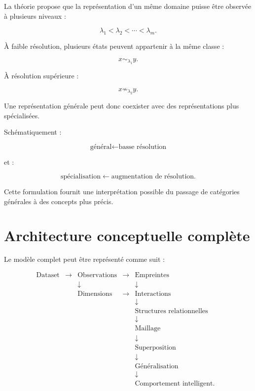 \documentclass[11pt,a4paper]{article}
\begin{document}
La théorie propose que la représentation d'un même domaine puisse être
observée à plusieurs niveaux :

\[
\lambda_1<\lambda_2<\cdots<\lambda_m.
\]

À faible résolution, plusieurs états peuvent appartenir à la même classe :

\[
x\sim_{\lambda_1}y.
\]

À résolution supérieure :

\[
x\not\sim_{\lambda_2}y.
\]

Une représentation générale peut donc coexister avec des représentations
plus spécialisées.

Schématiquement :

\[
\boxed{
\text{général}
\leftarrow
\text{basse résolution}
}
\]

et :

\[
\boxed{
\text{spécialisation}
\leftarrow
\text{augmentation de résolution}.
}
\]

Cette formulation fournit une interprétation possible du passage de
catégories générales à des concepts plus précis.

\section{Architecture conceptuelle complète}

Le modèle complet peut être représenté comme suit :

\[
\begin{array}{cccccc}
\text{Dataset}
&
\longrightarrow
&
\text{Observations}
&
\longrightarrow
&
\text{Empreintes}
&
\\[0.2cm]
&&
\downarrow
&&
\downarrow
&
\\[0.2cm]
&&
\text{Dimensions}
&
\longrightarrow
&
\text{Interactions}
&
\\[0.2cm]
&&
&&
\downarrow
&
\\[0.2cm]
&&
&&
\text{Structures relationnelles}
&
\\[0.2cm]
&&
&&
\downarrow
&
\\[0.2cm]
&&
&&
\text{Maillage}
&
\\[0.2cm]
&&
&&
\downarrow
&
\\[0.2cm]
&&
&&
\text{Superposition}
&
\\[0.2cm]
&&
&&
\downarrow
&
\\[0.2cm]
&&
&&
\text{Généralisation}
&
\\[0.2cm]
&&
&&
\downarrow
&
\\[0.2cm]
&&
&&
\text{Comportement intelligent}.
&
\end{array}
\]
\end{document}
